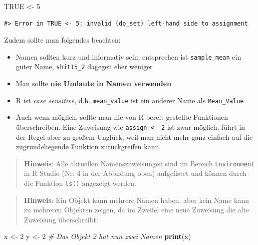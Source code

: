\documentclass[]{book}
\newenvironment{Shaded}{\begin{snugshade}}{\end{snugshade}}
\newcommand{\KeywordTok}[1]{\textcolor[rgb]{0.13,0.29,0.53}{\textbf{#1}}}
\newcommand{\DecValTok}[1]{\textcolor[rgb]{0.00,0.00,0.81}{#1}}
\newcommand{\StringTok}[1]{\textcolor[rgb]{0.31,0.60,0.02}{#1}}
\newcommand{\CommentTok}[1]{\textcolor[rgb]{0.56,0.35,0.01}{\textit{#1}}}
\newcommand{\OtherTok}[1]{\textcolor[rgb]{0.56,0.35,0.01}{#1}}
\newcommand{\NormalTok}[1]{#1}
\providecommand{\tightlist}{%
  \setlength{\itemsep}{0pt}\setlength{\parskip}{0pt}}
\begin{document}
\begin{Shaded}
\begin{Highlighting}[]
\OtherTok{TRUE}\NormalTok{ <-}\StringTok{ }\DecValTok{5}
\end{Highlighting}
\end{Shaded}

\begin{verbatim}
#> Error in TRUE <- 5: invalid (do_set) left-hand side to assignment
\end{verbatim}

Zudem sollte man folgendes beachten:

\begin{itemize}
\tightlist
\item
  Namen sollten kurz und informativ sein; entsprechen ist
  \texttt{sample\_mean} ein guter Name, \texttt{shit15\_2} dagegen eher
  weniger
\item
  Man sollte \textbf{nie Umlaute in Namen verwenden}
\item
  R ist \emph{case sensitive}, d.h. \texttt{mean\_value} ist ein anderer
  Name als \texttt{Mean\_Value}
\item
  Auch wenn möglich, sollte man nie von R bereit gestellte Funktionen
  überschreiben. Eine Zuweisung wie \texttt{assign\ \textless{}-\ 2} ist
  zwar möglich, führt in der Regel aber zu großem Unglück, weil man
  nicht mehr ganz einfach auf die zugrundeliegende Funktion
  zurückgreifen kann.
\end{itemize}

\begin{quote}
\textbf{Hinweis}: Alle aktuellen Namenszuweisungen sind im Bereich
\texttt{Environment} in R Studio (Nr. 4 in der Abbildung oben)
aufgelistet und können durch die Funktion \texttt{ls()} angezeigt
werden.
\end{quote}

\begin{quote}
\textbf{Hinweis}: Ein Objekt kann mehrere Namen haben, aber kein Name
kann zu mehreren Objekten zeigen, da im Zweifel eine neue Zuweisung die
alte Zuweisung überschreibt:
\end{quote}

\begin{Shaded}
\begin{Highlighting}[]
\NormalTok{x <-}\StringTok{ }\DecValTok{2} 
\NormalTok{y <-}\StringTok{ }\DecValTok{2} \CommentTok{# Das Objekt 2 hat nun zwei Namen}
\KeywordTok{print}\NormalTok{(x)}
\end{Highlighting}
\end{Shaded}
\end{document}
